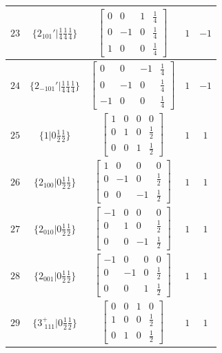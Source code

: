 \documentclass[fleqn,8pt]{jsarticle}
\begin{document}
\begin{longtable}{ccccc}
$ 23 $ & $ \{2{}_{101}{}'|\frac{1}{4} \frac{1}{4} \frac{1}{4}\} $ & $ \begin{bmatrix} 0 & 0 & 1 & \frac{1}{4} \\ 0 & -1 & 0 & \frac{1}{4} \\ 1 & 0 & 0 & \frac{1}{4} \end{bmatrix} $ & $ 1 $ & $ -1 $ \\ \hline
$ 24 $ & $ \{2{}_{-101}{}'|\frac{1}{4} \frac{1}{4} \frac{1}{4}\} $ & $ \begin{bmatrix} 0 & 0 & -1 & \frac{1}{4} \\ 0 & -1 & 0 & \frac{1}{4} \\ -1 & 0 & 0 & \frac{1}{4} \end{bmatrix} $ & $ 1 $ & $ -1 $ \\ \hline
$ 25 $ & $ \{1|0 \frac{1}{2} \frac{1}{2}\} $ & $ \begin{bmatrix} 1 & 0 & 0 & 0 \\ 0 & 1 & 0 & \frac{1}{2} \\ 0 & 0 & 1 & \frac{1}{2} \end{bmatrix} $ & $ 1 $ & $ 1 $ \\ \hline
$ 26 $ & $ \{2{}_{100}|0 \frac{1}{2} \frac{1}{2}\} $ & $ \begin{bmatrix} 1 & 0 & 0 & 0 \\ 0 & -1 & 0 & \frac{1}{2} \\ 0 & 0 & -1 & \frac{1}{2} \end{bmatrix} $ & $ 1 $ & $ 1 $ \\ \hline
$ 27 $ & $ \{2{}_{010}|0 \frac{1}{2} \frac{1}{2}\} $ & $ \begin{bmatrix} -1 & 0 & 0 & 0 \\ 0 & 1 & 0 & \frac{1}{2} \\ 0 & 0 & -1 & \frac{1}{2} \end{bmatrix} $ & $ 1 $ & $ 1 $ \\ \hline
$ 28 $ & $ \{2{}_{001}|0 \frac{1}{2} \frac{1}{2}\} $ & $ \begin{bmatrix} -1 & 0 & 0 & 0 \\ 0 & -1 & 0 & \frac{1}{2} \\ 0 & 0 & 1 & \frac{1}{2} \end{bmatrix} $ & $ 1 $ & $ 1 $ \\ \hline
$ 29 $ & $ \{3^{+}_{\,\,111}|0 \frac{1}{2} \frac{1}{2}\} $ & $ \begin{bmatrix} 0 & 0 & 1 & 0 \\ 1 & 0 & 0 & \frac{1}{2} \\ 0 & 1 & 0 & \frac{1}{2} \end{bmatrix} $ & $ 1 $ & $ 1 $ \\ \hline

\end{longtable}
\end{document}
